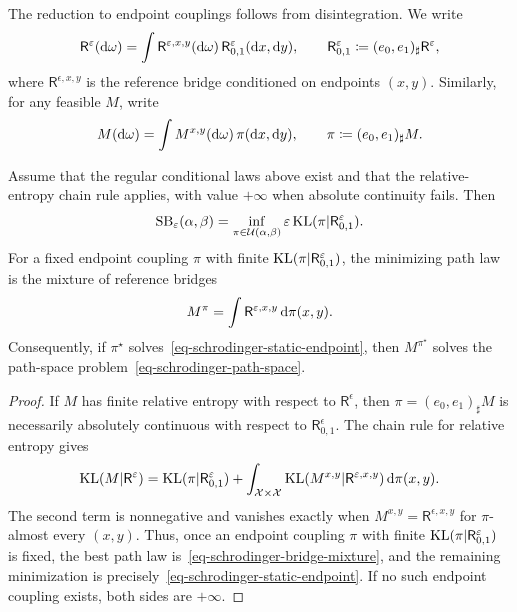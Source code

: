The reduction to endpoint couplings follows from disintegration. We write
\[
	\mathsf R^\varepsilon(\mathrm{d}\omega)
	=
	\int \mathsf R^{\varepsilon,x,y}(\mathrm{d}\omega)\,
		\mathsf R^\varepsilon_{0,1}(\mathrm{d} x,\mathrm{d} y),
	\qquad
	\mathsf R^\varepsilon_{0,1}\coloneqq(e_0,e_1)_\sharp\mathsf R^\varepsilon,
\]
where $\mathsf R^{\epsilon,x,y}$ is the reference bridge conditioned on endpoints $(x,y)$. Similarly, for any feasible $M$, write
\[
	M(\mathrm{d}\omega)
	=
	\int M^{x,y}(\mathrm{d}\omega)\,\pi(\mathrm{d} x,\mathrm{d} y),
	\qquad
	\pi\coloneqq(e_0,e_1)_\sharp M.
\]

\begin{prop}\label{prop-schrodinger-endpoint-reduction}
	Assume that the regular conditional laws above exist and that the relative-entropy chain rule applies, with value $+\infty$ when absolute continuity fails. Then
	\begin{equation}\label{eq-schrodinger-static-endpoint}
		\mathrm{SB}_\varepsilon(\alpha,\beta)
		=
		\inf_{\pi\in\mathcal{U}(\alpha,\beta)}
		\varepsilon\operatorname{KL}(\pi|\mathsf R^\varepsilon_{0,1}).
	\end{equation}
	For a fixed endpoint coupling $\pi$ with finite $\operatorname{KL}(\pi|\mathsf R^\varepsilon_{0,1})$, the minimizing path law is the mixture of reference bridges
	\begin{equation}\label{eq-schrodinger-bridge-mixture}
		M^\pi
		=
		\int \mathsf R^{\varepsilon,x,y}\,\mathrm{d}\pi(x,y).
	\end{equation}
	Consequently, if $\pi^\star$ solves~\eqref{eq-schrodinger-static-endpoint}, then $M^{\pi^\star}$ solves the path-space problem~\eqref{eq-schrodinger-path-space}.
\end{prop}

\begin{proof}
	If $M$ has finite relative entropy with respect to $\mathsf R^\epsilon$, then $\pi=(e_0,e_1)_\sharp M$ is necessarily absolutely continuous with respect to $\mathsf R^\epsilon_{0,1}$. The chain rule for relative entropy gives
	\begin{equation}\label{eq-kl-chain-rule-path}
		\operatorname{KL}(M|\mathsf R^\varepsilon)
		=
		\operatorname{KL}(\pi|\mathsf R^\varepsilon_{0,1})
		+
		\int_{\mathcal{X}\times\mathcal{X}}
			\operatorname{KL}(M^{x,y}|\mathsf R^{\varepsilon,x,y})
			\,\mathrm{d}\pi(x,y).
	\end{equation}
	The second term is nonnegative and vanishes exactly when $M^{x,y}=\mathsf R^{\epsilon,x,y}$ for $\pi$-almost every $(x,y)$. Thus, once an endpoint coupling $\pi$ with finite $\operatorname{KL}(\pi|\mathsf R^\varepsilon_{0,1})$ is fixed, the best path law is~\eqref{eq-schrodinger-bridge-mixture}, and the remaining minimization is precisely~\eqref{eq-schrodinger-static-endpoint}. If no such endpoint coupling exists, both sides are $+\infty$.
\end{proof}

